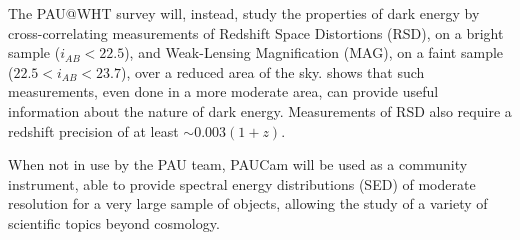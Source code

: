 The PAU@WHT survey will, instead, study the properties of dark energy by cross-correlating measurements of Redshift Space Distortions (RSD), on a bright sample ($i_{AB}<22.5$), and Weak-Lensing Magnification (MAG), on a faint sample ($22.5<i_{AB}<23.7$), over a reduced area of the sky. \citet{Gaztanaga2012} shows that such measurements, even done in a more moderate area, can provide useful information about the nature of dark energy. Measurements of RSD also require a redshift precision of at least $\sim 0.003(1+z)$. 

When not in use by the PAU team, PAUCam will be used as a community instrument, able to provide spectral energy distributions (SED) of moderate resolution for a very large sample of objects, allowing the study of a variety of scientific topics beyond cosmology. 
